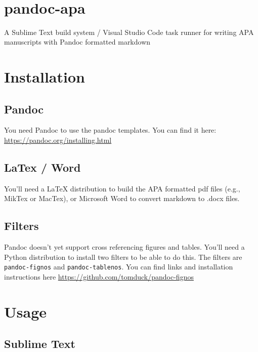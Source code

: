 \documentclass[,longtable]{apa6}
\title{~}\shorttitle{~}\author{~}\affiliation{~}
\begin{document}
\hypertarget{pandoc-apa}{%
\section{pandoc-apa}\label{pandoc-apa}}

A Sublime Text build system / Visual Studio Code task runner for writing
APA manuscripts with Pandoc formatted markdown

\hypertarget{installation}{%
\section{Installation}\label{installation}}

\hypertarget{pandoc}{%
\subsection{Pandoc}\label{pandoc}}

You need Pandoc to use the pandoc templates. You can find it here:
\url{https://pandoc.org/installing.html}

\hypertarget{latex-word}{%
\subsection{LaTex / Word}\label{latex-word}}

You'll need a LaTeX distribution to build the APA formatted pdf files
(e.g., MikTex or MacTex), or Microsoft Word to convert markdown to .docx
files.

\hypertarget{filters}{%
\subsection{Filters}\label{filters}}

Pandoc doesn't yet support cross referencing figures and tables. You'll
need a Python distribution to install two filters to be able to do this.
The filters are \texttt{pandoc-fignos} and \texttt{pandoc-tablenos}. You
can find links and installation instructions here
\url{https://github.com/tomduck/pandoc-fignos}

\hypertarget{usage}{%
\section{Usage}\label{usage}}

\hypertarget{sublime-text}{%
\subsection{Sublime Text}\label{sublime-text}}
\end{document}
